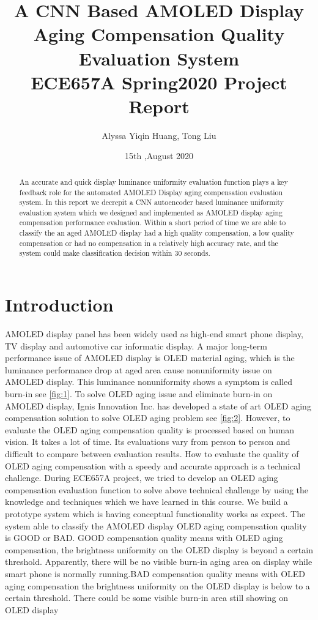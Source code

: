\documentclass[runningheads]{llncs}
\title{A CNN Based AMOLED Display Aging Compensation Quality Evaluation System\\
ECE657A Spring2020 Project Report}
\author{Alyssa Yiqin Huang, Tong Liu}
\date{15th ,August 2020}
\institute{Electrical and Computer Engineering, University of Waterloo\\
200 University Ave W, Waterloo, ON N2L 3G1, Ontario, Canada\\
\email{ yiqin.huang@uwaterloo.ca ,t344liu@uwaterloo.ca}}
\begin{document}
\maketitle              %
%
\begin{abstract}
An accurate and quick display luminance uniformity evaluation function plays a key feedback role for the automated AMOLED Display aging compensation evaluation system. In this report we decrepit a CNN  autoencoder based luminance uniformity evaluation system which we designed and implemented as AMOLED display aging compensation performance evaluation. Within a short period of time we are able to classify the an aged AMOLED display had a high quality compensation, a low quality compensation or had no compensation in a relatively high accuracy rate, and the system could make classification decision within 30 seconds.
\end{abstract}

%
%
%
\section{Introduction}
AMOLED display panel has been widely used as high-end smart phone display, TV display and
automotive car informatic display. A major long-term performance issue of AMOLED display is OLED
material aging, which is the luminance performance drop at aged area cause nonuniformity issue on AMOLED display. This luminance nonuniformity shows a symptom is called burn-in see \ref{fig:1}.
To solve OLED aging issue and eliminate burn-in on AMOLED display, Ignis Innovation Inc. has developed a state of art OLED aging compensation solution to solve OLED aging problem see \ref{fig:2}.
However, to evaluate the OLED aging compensation quality is processed based on human vision. It
takes a lot of time. Its evaluations vary from person to person and difficult to compare between
evaluation results. How to evaluate the quality of OLED aging compensation with a speedy and
accurate approach is a technical challenge.
During ECE657A project, we tried to develop an OLED aging compensation evaluation function to solve above technical challenge by using the knowledge and techniques which we have learned in this course. We build a prototype system which is having conceptual functionality works as expect. The system able to classify the AMOLED display OLED aging compensation quality is GOOD or BAD. GOOD compensation quality means with OLED aging compensation, the brightness uniformity on the OLED display is beyond a certain threshold. Apparently, there will be no visible burn-in aging area on display while smart phone is normally running.BAD compensation quality means with OLED aging compensation the brightness uniformity on the OLED display is below to a certain threshold. There could be some visible burn-in area still showing on OLED display
\end{document}
